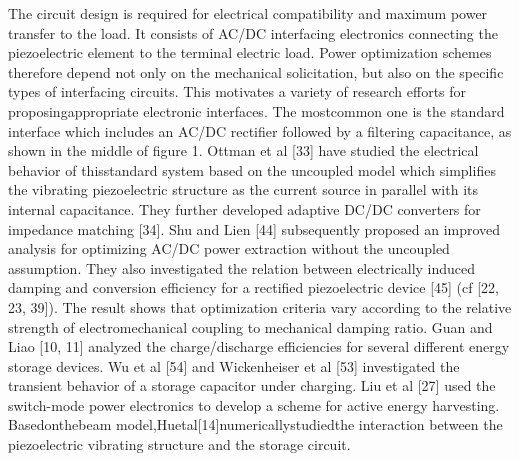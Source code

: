 \documentclass{article}
\begin{document}
The circuit design is required for electrical compatibility
and maximum power transfer to the load. It consists of
AC/DC interfacing electronics connecting the piezoelectric
element to the terminal electric load. Power optimization
schemes therefore depend not only on the mechanical
solicitation, but also on the specific types of interfacing
circuits. This motivates a variety of research efforts for
proposingappropriate electronic interfaces. The mostcommon
one is the standard interface which includes an AC/DC rectifier
followed by a filtering capacitance, as shown in the middle
of figure 1. Ottman et al [33] have studied the electrical
behavior of thisstandard system based on the uncoupled model
which simplifies the vibrating piezoelectric structure as the
current source in parallel with its internal capacitance. They
further developed adaptive DC/DC converters for impedance
matching [34]. Shu and Lien [44] subsequently proposed
an improved analysis for optimizing AC/DC power extraction
without the uncoupled assumption. They also investigated
the relation between electrically induced damping and
conversion efficiency for a rectified piezoelectric device [45]
(cf [22, 23, 39]). The result shows that optimization criteria
vary according to the relative strength of electromechanical
coupling to mechanical damping ratio. Guan and Liao [10, 11]
analyzed the charge/discharge efficiencies for several different
energy storage devices. Wu et al [54] and Wickenheiser et al
[53] investigated the transient behavior of a storage capacitor
under charging. Liu et al [27] used the switch-mode power
electronics to develop a scheme for active energy harvesting.
Basedonthebeam model,Huetal[14]numericallystudiedthe
interaction between the piezoelectric vibrating structure and
the storage circuit.
\end{document}
